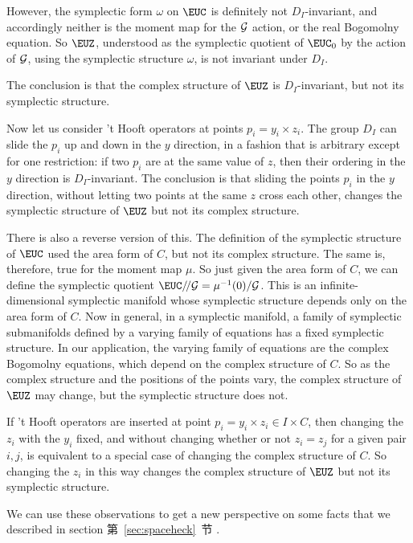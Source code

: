 However, the symplectic form $\omega$ on $\EUC$ is definitely not
$D_I$-invariant, and accordingly neither is the moment map for the
${\cal G}$ action, or the real Bogomolny equation.  So ${\EUZ}$,
understood as the symplectic quotient of ${\EUC}_0$ by the action
of ${\cal G}$, using the symplectic structure $\omega$, is not
invariant under $D_I$.

The conclusion is that the complex structure of ${\EUZ}$ is
$D_I$-invariant, but not its symplectic structure.

Now let us consider 't Hooft operators at points $p_i=y_i\times
z_i$.  The group $D_I$ can slide the $p_i$ up and down in the $y$
direction, in a fashion that is arbitrary except for one
restriction: if two $p_i$ are at the same value of $z$, then their
ordering in the $y$ direction is $D_I$-invariant. The conclusion
is that sliding the points $p_i$ in the $y$ direction, without
letting two points at the same $z$ cross each other, changes the
symplectic structure of $\EUZ$ but not its complex structure.

There is also a reverse version of this.  The definition of the
symplectic structure of $\EUC$ used the area form of $C$, but not
its complex structure.  The same is, therefore, true for the
moment map $\mu$.  So just given the area form of $C$, we can
define the symplectic quotient $\EUC/\negthinspace/{\cal
G}=\mu^{-1}(0)/{\cal G}$. This is an infinite-dimensional
symplectic manifold whose symplectic structure depends only on the
area form of $C$.  Now in general, in a symplectic manifold, a
family of symplectic submanifolds defined by a varying family of
equations has a fixed symplectic structure.  In our application,
the varying family of equations are the complex Bogomolny
equations, which depend on the complex structure of $C$. So as the
complex structure and the positions of the points vary, the
complex structure of ${\EUZ}$ may change, but the symplectic
structure does not.

If 't Hooft operators are inserted at point $p_i=y_i\times z_i\in
I\times C$, then changing the $z_i$ with the $y_i$ fixed, and
without changing whether or not $z_i=z_j$ for a given pair $i,j$,
is equivalent to a special case of changing the complex structure
of $C$.  So changing the $z_i$ in this way changes the complex
structure of ${\EUZ}$ but not its symplectic structure.

\par{}

We can use these observations to get a new perspective on some
facts that we described in section 第~\ref{sec:spaceheck}~节 .

